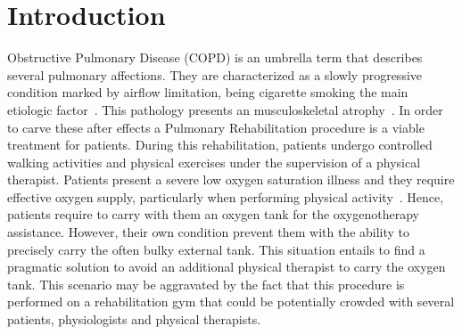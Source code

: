 \documentclass[journal]{IEEEtran}
\begin{document}
\section{Introduction}
% 
% 
% 
% 


 Obstructive Pulmonary Disease (COPD) is an umbrella term that describes several pulmonary affections.  They are characterized as a slowly progressive condition marked by airflow limitation, being cigarette smoking the main etiologic factor~\cite{MacNee2005}. This pathology presents an musculoskeletal atrophy~\cite{Kocsis2016,Wu2012}. In order to carve these after effects a Pulmonary Rehabilitation procedure is a viable treatment for patients.  During this rehabilitation, patients undergo controlled walking activities and physical exercises under the supervision of a physical therapist.   Patients present a severe low oxygen saturation illness and they require effective oxygen supply, particularly when performing physical activity~\cite{Celli2014}.  Hence, patients require to carry with them an oxygen tank for the oxygenotherapy assistance.  However, their own condition prevent them with the ability to precisely carry the often bulky external tank.  This situation entails to find a pragmatic solution to avoid an additional physical therapist to carry the oxygen tank.  This scenario may be aggravated by the fact that this procedure is performed on a rehabilitation gym that could be potentially crowded with several patients, physiologists and physical therapists.  

\end{document}
